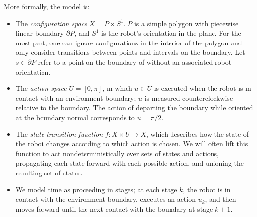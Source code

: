 \documentclass[]{styles/svproc}  %
\begin{document}
More formally, the model is:
\begin{itemize}
\item The \emph{configuration space} $X = P \times S^1$. $P$ is a simple polygon with 
piecewise linear boundary $\partial P$, and $S^1$ is the robot's orientation in the plane. For the most part, one can ignore configurations in the interior
of the polygon and only consider transitions between points and intervals on the
boundary. Let $s \in \partial P$ refer to a point on
the boundary of without an associated robot orientation.
\item The \emph{action space} $U = [0,\pi]$, in which $u \in U$ is executed when
the robot is in contact with an environment boundary; $u$ is measured counterclockwise
relative to the boundary. The action of departing the boundary while oriented at the boundary
normal corresponds to $u = \pi/2$.
\item The \emph{state transition function} $f: X \times U \to X$, which
describes how the state of the robot changes according to which action is
chosen. We will often lift this function to act nondeterministically over sets
of states and actions, propagating each state forward with each possible action,
and unioning the resulting set of states. 
\item We model time as proceeding in stages; at each stage $k$, the robot
is in contact with the environment boundary, executes an action $u_k$, and then
moves forward until the next contact with the boundary at stage $k+1$.
\end{itemize}
\end{document}
